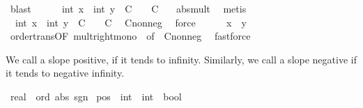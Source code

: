 \begin{isabellebody}
\ blast\isanewline
\ \ \ \ \isamarkupfalse%
\ {\isachardoublequoteopen}{\isasymbar}int\ x\ {\isacharminus}{\kern0pt}\ int\ y{\isasymbar}\ {\isacharasterisk}{\kern0pt}\ {\isasymbar}C\ {\isacharplus}{\kern0pt}\ {}{\isasymbar}\ {\isasymle}\ C{\isachardoublequoteclose}\ \ \isamarkupfalse%
\ abs{\isacharunderscore}{\kern0pt}mult\ \isamarkupfalse%
\ metis\isanewline
\ \ \ \ \isamarkupfalse%
\ {\isacharasterisk}{\kern0pt}{\isacharcolon}{\kern0pt}\ {\isachardoublequoteopen}{\isasymbar}int\ x\ {\isacharminus}{\kern0pt}\ int\ y{\isasymbar}\ {\isacharasterisk}{\kern0pt}\ {\isacharparenleft}{\kern0pt}C\ {\isacharplus}{\kern0pt}\ {}{\isacharparenright}{\kern0pt}\ {\isasymle}\ C{\isachardoublequoteclose}\ \isamarkupfalse%
\ C{\isacharunderscore}{\kern0pt}nonneg\ \isamarkupfalse%
\ force\isanewline
\ \ \ \ \isamarkupfalse%
\ {\isachardoublequoteopen}x\ {\isacharequal}{\kern0pt}\ y{\isachardoublequoteclose}\ \isamarkupfalse%
\ order{\isacharunderscore}{\kern0pt}trans{\isacharbrackleft}{\kern0pt}OF\ mult{\isacharunderscore}{\kern0pt}right{\isacharunderscore}{\kern0pt}mono\ {\isacharasterisk}{\kern0pt}{\isacharcomma}{\kern0pt}\ of\ {}{\isacharbrackright}{\kern0pt}\ C{\isacharunderscore}{\kern0pt}nonneg\ \isamarkupfalse%
\ fastforce\isanewline
\ \ \isamarkupfalse%
\isanewline
{}\isamarkupfalse%
%
\endisatagproof
{\isafoldproof}%
%
\isadelimproof
%
\endisadelimproof
%
\isadelimdocument
%
\endisadelimdocument
%
\isatagdocument
%
\isamarkuptrue%
%
\endisatagdocument
{\isafolddocument}%
%
\isadelimdocument
%
\endisadelimdocument
%
\begin{isamarkuptext}%
We call a slope positive, if it tends to infinity. Similarly, we call a slope negative if it tends to negative infinity.%
\end{isamarkuptext}\isamarkuptrue%
\isamarkupfalse%
\ real\ {\isacharcolon}{\kern0pt}{\isacharcolon}{\kern0pt}\ {\isachardoublequoteopen}{\isacharbraceleft}{\kern0pt}ord{\isacharcomma}{\kern0pt}\ abs{\isacharcomma}{\kern0pt}\ sgn{\isacharbraceright}{\kern0pt}{\isachardoublequoteclose}\isanewline
{}\isanewline
\isanewline
{}\isamarkupfalse%
\ pos\ {\isacharcolon}{\kern0pt}{\isacharcolon}{\kern0pt}\ {\isachardoublequoteopen}{\isacharparenleft}{\kern0pt}int\ {\isasymRightarrow}\ int{\isacharparenright}{\kern0pt}\ {\isasymRightarrow}\ bool{\isachardoublequoteclose}\ \isanewline

\end{isabellebody}
